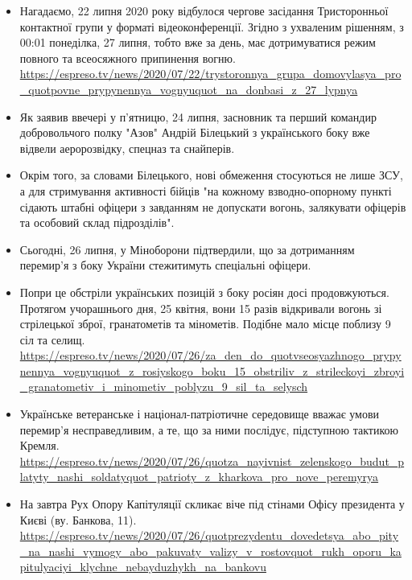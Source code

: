 \documentclass[a4paper,11pt]{extreport}
\begin{document}
\begin{itemize}
		\item Нагадаємо, 22 липня 2020 року відбулося чергове засідання Тристоронньої
		контактної групи у форматі відеоконференції. Згідно з ухваленим рішенням, з
		00:01 понеділка, 27 липня, тобто вже за день, має дотримуватися режим
		повного та всеосяжного припинення вогню.
								\url{https://espreso.tv/news/2020/07/22/trystoronnya_grupa_domovylasya_pro_quotpovne_prypynennya_vognyuquot_na_donbasi_z_27_lypnya}

		\item Як заявив ввечері у п'ятницю, 24 липня, засновник та перший командир
		добровольчого полку "Азов" Андрій Білецький з українського боку вже відвели
		аеророзвідку, спецназ та снайперів.

		\item Окрім того, за словами Білецького, нові обмеження стосуються не лише ЗСУ, а
		для стримування активності бійців "на кожному взводно-опорному пункті
		сідають штабні офіцери з завданням не допускати вогонь, залякувати офіцерів
		та особовий склад підрозділів".

		\item Сьогодні, 26 липня, у Міноборони підтвердили, що за дотриманням перемир'я з
		боку України стежитимуть спеціальні офіцери.

		\item Попри це обстріли українських позицій з боку росіян досі продовжуються.
		Протягом учорашнього дня, 25 квітня, вони 15 разів відкривали вогонь зі
		стрілецької зброї, гранатометів та мінометів. Подібне мало місце поблизу 9
		сіл та селищ.
								\url{https://espreso.tv/news/2020/07/26/za_den_do_quotvseosyazhnogo_prypynennya_vognyuquot_z_rosiyskogo_boku_15_obstriliv_z_strileckoyi_zbroyi_granatometiv_i_minometiv_poblyzu_9_sil_ta_selysch}

		\item Українське ветеранське і націонал-патріотичне середовище вважає умови
		перемир'я несправедливим, а те, що за ними послідує, підступною тактикою
		Кремля.
		\url{https://espreso.tv/news/2020/07/26/quotza_nayivnist_zelenskogo_budut_platyty_nashi_soldatyquot_patrioty_z_kharkova_pro_nove_peremyrya}

		\item На завтра Рух Опору Капітуляції скликає віче під стінами Офісу президента у
		Києві (ву. Банкова, 11).
								\url{https://espreso.tv/news/2020/07/26/quotprezydentu_dovedetsya_abo_pity_na_nashi_vymogy_abo_pakuvaty_valizy_v_rostovquot_rukh_oporu_kapitulyaciyi_klychne_nebayduzhykh_na_bankovu}
\end{itemize}
\end{document}
